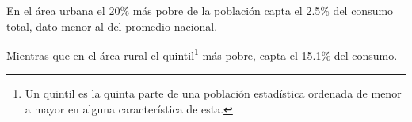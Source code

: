 En el área urbana el 20\% más pobre de la población    capta  el 2.5\% del consumo total, dato menor al del promedio nacional.

Mientras que en el área rural el quintil\footnote{Un quintil es la quinta parte de una población estadística ordenada de menor a mayor en alguna característica de esta.} más pobre,  capta el 15.1\% del consumo.